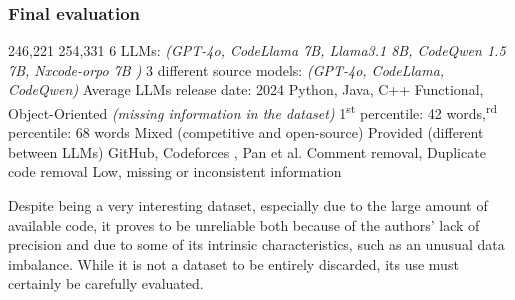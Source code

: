 





\clearpage %

\subsubsection*{Final evaluation}

\expandafter\def\csname CoDetM4HumanCode\endcsname{246,221}
\expandafter\def\csname CoDetM4LLMCode\endcsname{254,331}
\expandafter\def\csname CoDetM4NumLLMs\endcsname{6 LLMs: \textit{(GPT-4o, CodeLlama 7B, Llama3.1 8B, CodeQwen 1.5 7B, Nxcode-orpo 7B )}}
\expandafter\def\csname CoDetM4LLMDiversity\endcsname{3 different source models: \textit{(GPT-4o, CodeLlama, CodeQwen) }}
\expandafter\def\csname CoDetM4CurrentUse\endcsname{Average LLMs release date: 2024}
\expandafter\def\csname CoDetM4Languages\endcsname{Python, Java, C++}
\expandafter\def\csname CoDetM4CodeTypes\endcsname{Functional, Object-Oriented \textit{(missing information in the dataset)}}
\expandafter\def\csname CoDetM4CodeSize\endcsname{1\textsuperscript{st} percentile: 42 words,\textsuperscript{rd} percentile: 68 words}
\expandafter\def\csname CoDetM4CodeContext\endcsname{Mixed (competitive and open-source)}
\expandafter\def\csname CoDetM4Prompts\endcsname{Provided (different between LLMs)}
\expandafter\def\csname CoDetM4Sources\endcsname{GitHub, Codeforces \cite{CodeforcesKaggle}, Pan et al. \cite{pan2024assessing}}
\expandafter\def\csname CoDetM4CodeQuality\endcsname{Comment removal, Duplicate code removal}
\expandafter\def\csname CoDetM4Reliability\endcsname{Low, missing or inconsistent information}




Despite being a very interesting dataset, 
especially due to the large amount of available code, 
it proves to be unreliable both because of the authors' 
lack of precision and due to some of its intrinsic 
characteristics, such as an unusual data imbalance. 
While it is not a dataset to be entirely discarded, 
its use must certainly be carefully evaluated.